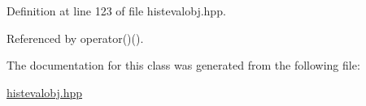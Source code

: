\-Definition at line 123 of file histevalobj.\-hpp.



\-Referenced by operator()().



\-The documentation for this class was generated from the following file\-:\begin{DoxyCompactItemize}
\item 
\hyperlink{histevalobj_8hpp}{histevalobj.\-hpp}\end{DoxyCompactItemize}
